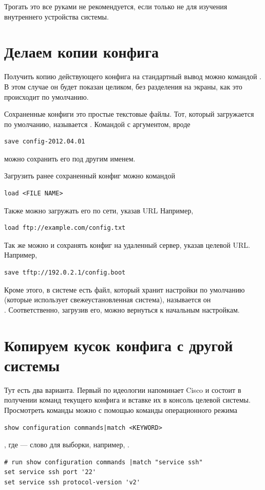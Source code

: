\documentclass[a4paper,12pt, twoside, russian]{report}
\begin{document}
Трогать это все руками не рекомендуется, если только не для изучения внутреннего устройства системы.

\section{Делаем копии конфига}

Получить копию действующего конфига на стандартный вывод можно командой .
В этом случае он будет показан целиком, без разделения на экраны, как это происходит по умолчанию.

Сохраненные конфиги это простые текстовые файлы. Тот, который загружается по умолчанию, называется 
. Командой  с аргументом, вроде 
\begin{verbatim}save config-2012.04.01\end{verbatim}
можно сохранить его под другим именем.

Загрузить ранее сохраненный конфиг можно командой \begin{verbatim}load <FILE NAME>\end{verbatim}
Также можно загружать его по сети, указав URL Например, 
\begin{verbatim}load ftp://example.com/config.txt\end{verbatim}

Так же можно и сохранять конфиг на удаленный сервер, указав целевой URL. Например, 
\begin{verbatim}save tftp://192.0.2.1/config.boot\end{verbatim}

Кроме этого, в системе есть файл, который хранит настройки по умолчанию (которые использует 
свежеустановленная система), называется он \\ .
Соответственно, загрузив его, можно вернуться к начальным настройкам.

\section{Копируем кусок конфига с другой системы}

Тут есть два варианта. Первый по идеологии напоминает Cisco и состоит в получении команд текущего
конфига и вставке их в консоль целевой системы. Просмотреть команды можно с помощью команды операционного
режима \begin{verbatim}show configuration commands|match <KEYWORD>\end{verbatim}, 
где  --- слово для выборки, например, .
\begin{verbatim}
# run show configuration commands |match "service ssh"
set service ssh port '22'
set service ssh protocol-version 'v2'
\end{verbatim}
\end{document}
